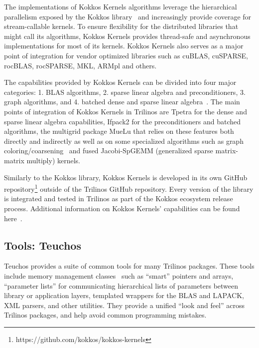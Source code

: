 The implementations of Kokkos Kernels algorithms leverage the hierarchical parallelism exposed by the Kokkos library~\cite{kim2017designing} and increasingly provide coverage for stream-callable kernels. To ensure flexibility for the distributed libraries that might call its algorithms, Kokkos Kernels provides thread-safe and asynchronous implementations for most of its kernels. Kokkos Kernels also serves as a major point of integration for vendor optimized libraries such as cuBLAS, cuSPARSE, rocBLAS, rocSPARSE, MKL, ARMpl and others.

The capabilities provided by Kokkos Kernels can be divided into four major categories:
1. BLAS algorithms, 2. sparse linear algebra and preconditioners, 3. graph algorithms, and
4. batched dense and sparse linear algebra~\cite{liegeois2023performance}. The main
points of integration of Kokkos Kernels in Trilinos are Tpetra for the dense and sparse
linear algebra capabilities, Ifpack2 for the preconditioners and batched algorithms,
the multigrid package MueLu that relies on these features both directly and indirectly
as well as on some specialized algorithms such as graph
coloring/coarsening~\cite{kelley2022parallel} and fused Jacobi-SpGEMM (generalized sparse matrix-matrix multiply) kernels.

Similarly to the Kokkos library, Kokkos Kernels is developed in its own GitHub
repository\footnote{https://github.com/kokkos/kokkos-kernels} outside of the Trilinos
GitHub repository. Every version of the library is integrated and tested in Trilinos
as part of the Kokkos ecosystem release process. Additional information on Kokkos
Kernels' capabilities can be found here~\cite{deveci2018multithreaded,wolf2017fast}.



\subsection{Tools: Teuchos}

Teuchos provides a suite of common tools for many Trilinos packages. These tools include memory management classes~\cite{bartlett2010} such as ``smart'' pointers and arrays, ``parameter lists'' for communicating hierarchical lists of parameters between library or application layers, templated wrappers for the BLAS and LAPACK, XML parsers, and other utilities. They provide a unified ``look and feel'' across Trilinos packages, and help avoid common programming mistakes.



